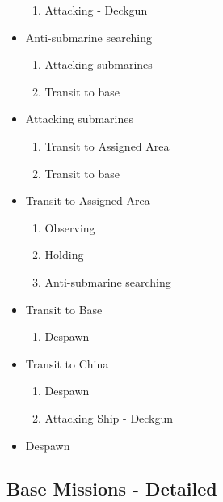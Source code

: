 \documentclass{article}
\begin{document}
\begin{itemize}
\begin{enumerate}[label=\arabic*)]
            \item Attacking - Deckgun
        \end{enumerate}    
    \item Anti-submarine searching
        \begin{enumerate}[label=\arabic*)]
            \item Attacking submarines
            \item Transit to base
        \end{enumerate}
    \item Attacking submarines
        \begin{enumerate}[label=\arabic*)]
            \item Transit to Assigned Area
            \item Transit to base
        \end{enumerate}
    \item Transit to Assigned Area
        \begin{enumerate}[label=\arabic*)]
            \item Observing
            \item Holding
            \item Anti-submarine searching
        \end{enumerate}
    \item Transit to Base
        \begin{enumerate}[label=\arabic*)]
            \item Despawn
        \end{enumerate}
    \item Transit to China
        \begin{enumerate}[label=\arabic*)]
            \item Despawn
            \item Attacking Ship - Deckgun
        \end{enumerate}
    \item Despawn
\end{itemize}

\subsection{Base Missions - Detailed}
\end{document}
